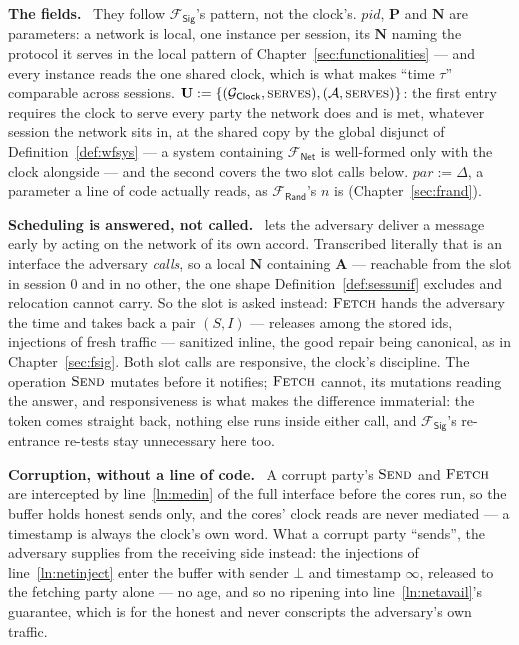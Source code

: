 \documentclass[10pt,oneside,openany]{book}
\newcommand{\Ps}{\mathbf{P}}
\newcommand{\PID}{\mathit{pid}}
\newcommand{\admits}{\mathbf{N}}
\newcommand{\Apid}{\mathbf{A}}
\newcommand{\pars}{\mathit{par}}
\newcommand{\uses}{\mathbf{U}}
\newcommand{\serves}{\op{serves}}
\newcommand{\Adv}{\mathcal{A}}
\newcommand{\op}[1]{\textnormal{\textsc{#1}}}
\newcommand{\Frand}{\mathcal{F}_{\mathsf{Rand}}}
\newcommand{\Fsig}{\mathcal{F}_{\mathsf{Sig}}}
\newcommand{\Gclock}{\mathcal{G}_{\mathsf{Clock}}}
\newcommand{\Fnet}{\mathcal{F}_{\mathsf{Net}}}
\newcommand{\none}{\bot}
\newcommand{\heading}[1]{\medskip\par\noindent\textcolor{accent}{\textbf{#1.}}\ }
\theoremstyle{accentdef}
\theoremstyle{accentplain}
\begin{document}
\heading{The fields} They follow $\Fsig$'s pattern, not the clock's. $\PID$, $\Ps$ and $\admits$
are parameters: a network is local, one instance per session, its $\admits$ naming the protocol
it serves in the local pattern of Chapter~\ref{sec:functionalities} --- and every instance reads
the one shared clock, which is what makes ``time $\tau$'' comparable across sessions.
$\uses := \{(\Gclock,\serves),(\Adv,\serves)\}$: the first entry requires the clock to serve
every party the network does and is met, whatever session the network sits in, at the shared copy
by the global disjunct of Definition~\ref{def:wfsys} --- a system containing $\Fnet$ is
well-formed only with the clock alongside --- and the second covers the two slot calls below.
$\pars := \Delta$, a parameter a line of code actually reads, as $\Frand$'s $n$ is
(Chapter~\ref{sec:frand}).

\heading{Scheduling is answered, not called} \cite{BMTZ17} lets the adversary deliver a message
early by acting on the network of its own accord. Transcribed literally that is an interface the
adversary \emph{calls}, so a local $\admits$ containing $\Apid$ --- reachable from the slot in
session $0$ and in no other, the one shape Definition~\ref{def:sessunif} excludes and relocation
cannot carry. So the slot is asked instead: $\op{Fetch}$ hands the adversary the time and takes
back a pair $(S,I)$ --- releases among the stored ids, injections of fresh traffic --- sanitized
inline, the good repair being canonical, as in Chapter~\ref{sec:fsig}. Both slot calls are
responsive, the clock's discipline. The operation $\op{Send}$ mutates before it notifies; $\op{Fetch}$ cannot,
its mutations reading the answer, and responsiveness is what makes the difference immaterial:
the token comes straight back, nothing else runs inside either call, and $\Fsig$'s re-entrance
re-tests stay unnecessary here too.

\heading{Corruption, without a line of code} A corrupt party's $\op{Send}$ and $\op{Fetch}$ are
intercepted by line~\ref{ln:medin} of the full interface before the cores run, so the buffer
holds honest sends only, and the cores' clock reads are never mediated --- a timestamp is always
the clock's own word. What a corrupt party ``sends'', the adversary supplies from the receiving
side instead: the injections of line~\ref{ln:netinject} enter the buffer with sender $\none$ and
timestamp $\infty$, released to the fetching party alone --- no age, and so no ripening into
line~\ref{ln:netavail}'s guarantee, which is for the honest and never conscripts the adversary's
own traffic.
\end{document}
